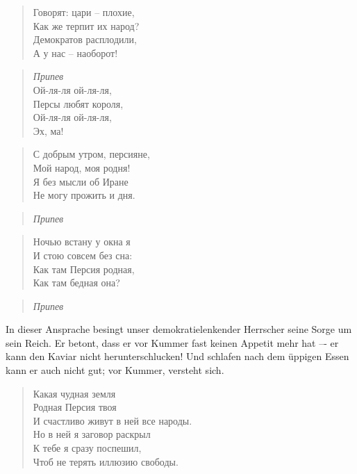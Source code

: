 \documentclass[12pt,a4paper,titlepage]{article}
\begin{document}
\begin{drama}
\ahspeaks {}
\begin{verse}
Говорят: цари -- плохие,\\
Как же терпит их народ?\\
Демократов расплодили,\\
А у нас -- наоборот!\\
\end{verse}

\begin{verse}
\textit{Припев}\\
Ой-ля-ля ой-ля-ля,\\
Персы любят короля,\\
Ой-ля-ля ой-ля-ля,\\
Эх, ма!\\
\end{verse}

\begin{verse}
С добрым утром, персияне,\\
Мой народ, моя родня!\\
Я без мысли об Иране\\
Не могу прожить и дня.\\
\end{verse}

\begin{verse}
\textit{Припев}\\
\end{verse}

\begin{verse}
Ночью встану у окна я\\
И стою совсем без сна:\\
Как там Персия родная,\\
Как там бедная она?\\
\end{verse}

\begin{verse}
\textit{Припев}\\
\end{verse}

\uespeaks
In dieser Ansprache besingt unser demokratielenkender Herrscher seine Sorge
um sein Reich. Er betont, dass er vor Kummer fast keinen Appetit mehr hat –-
er kann den Kaviar nicht herunterschlucken! Und schlafen nach dem üppigen Essen
kann er auch nicht gut; vor Kummer, versteht sich.


\scene


\mspeaks {}
\begin{verse}
Какая чудная земля\\
Родная Персия твоя\\
И счастливо живут в ней все народы.\\
Но в ней я заговор раскрыл\\
К тебе я сразу поспешил,\\
Чтоб не терять иллюзию свободы.\\
\end{verse}


\end{drama}
\end{document}
